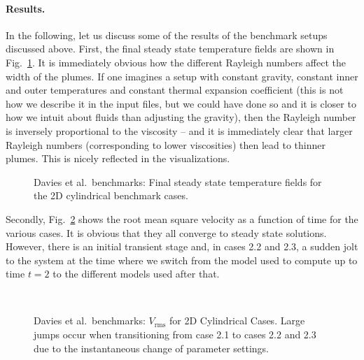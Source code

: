 \documentclass{article}
\begin{document}



\paragraph{Results.}

In the following, let us discuss some of the results of the benchmark setups
discussed above. First, the final steady state temperature fields are shown in
Fig.~\ref{fig:davies-2DcylinderFSS}. It is immediately obvious how the
different Rayleigh numbers affect the width of the plumes. If one imagines a
setup with constant gravity, constant inner and outer temperatures and
constant thermal expansion coefficient (this is not how we describe it in the
input files, but we could have done so and it is closer to how we intuit about
fluids than adjusting the gravity), then the Rayleigh number is inversely
proportional to the viscosity -- and it is immediately clear that larger
Rayleigh numbers (corresponding to lower viscosities) then lead to thinner
plumes. This is nicely reflected in the visualizations.

\begin{figure}[h]
  \hfill
  \hfill
  \hfill
  \hfill
  \caption{Davies et al.~benchmarks: Final steady state temperature fields for
    the 2D cylindrical benchmark cases.}
  \label{fig:davies-2DcylinderFSS}
\end{figure}

Secondly, Fig.~\ref{fig:davies-2DcylinderVrms} shows the root mean square
velocity as a function of time for the various cases. It is obvious that they
all converge to steady state solutions. However, there is an initial transient
stage and, in cases 2.2 and 2.3, a sudden jolt to the system at the time where
we switch from the model used to compute up to time $t=2$ to the
different models used after that.

\begin{figure}[h]
  \hfill
  \\
  \hfill
  \hfill
  \caption{Davies et al.~benchmarks: $V_{\text{rms}}$ for 2D Cylindrical Cases. Large jumps occur when transitioning from case 2.1 to cases 2.2 and 2.3 due to the instantaneous change of parameter settings.}
  \label{fig:davies-2DcylinderVrms}
\end{figure}
\end{document}
